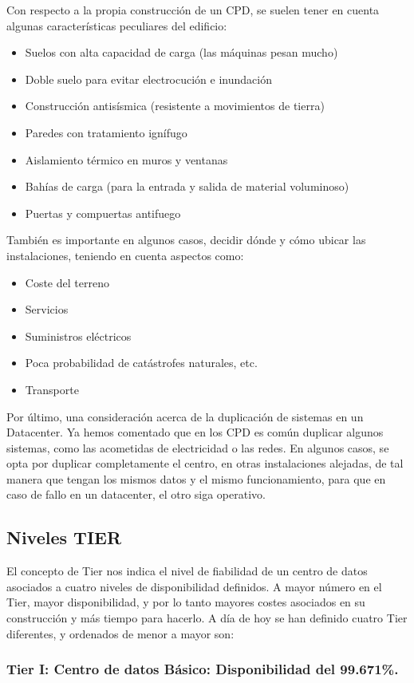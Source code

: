 \documentclass[a4paper]{article}
\begin{document}
Con respecto a la propia construcción de un CPD, se suelen tener en cuenta algunas características peculiares del edificio:
\begin{itemize}
\item Suelos con alta capacidad de carga (las máquinas pesan mucho)
\item Doble suelo para evitar electrocución e inundación
\item Construcción antisísmica (resistente a movimientos de tierra)
\item Paredes con tratamiento ignífugo
\item Aislamiento térmico en muros y ventanas
\item Bahías de carga (para la entrada y salida de material voluminoso)
\item Puertas y compuertas antifuego
\end{itemize}

También es importante en algunos casos, decidir dónde y cómo ubicar las instalaciones, teniendo en cuenta aspectos como:
\begin{itemize}
\item Coste del terreno
\item Servicios
\item Suministros eléctricos
\item Poca probabilidad de catástrofes naturales, etc.
\item Transporte
\end{itemize}


Por último, una consideración acerca de la duplicación de sistemas en un Datacenter. Ya hemos comentado que en los CPD es común duplicar algunos sistemas, como las acometidas de electricidad o las redes. En algunos casos, se opta por duplicar completamente el centro, en otras instalaciones alejadas, de tal manera que tengan los mismos datos y el mismo funcionamiento, para que en caso de fallo en un datacenter, el otro siga operativo.
\subsection{Niveles TIER}
\label{sec:org0000048}

El concepto de Tier nos indica el nivel de fiabilidad de un centro de datos asociados a cuatro niveles de disponibilidad definidos. A mayor número en el Tier, mayor disponibilidad, y por lo tanto mayores costes asociados en su construcción y más tiempo para hacerlo. A día de hoy se han definido cuatro Tier diferentes, y ordenados de menor a mayor son:
\subsubsection{Tier I: Centro de datos Básico: Disponibilidad del 99.671\%.}
\label{sec:org000003c}
\end{document}
